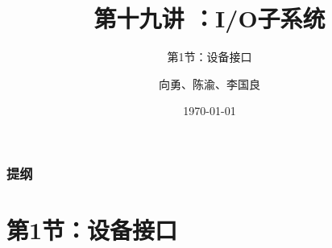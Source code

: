 


\title[第19讲]{第十九讲 ：I/O子系统} %
\subtitle{第1节：设备接口}
\author{向勇、陈渝、李国良} %
\date{\today} %



\begin{frame}
\titlepage %
\end{frame}

\begin{frame}
\frametitle{提纲} %
\tableofcontents %


\end{frame}
\section{第1节：设备接口} %
